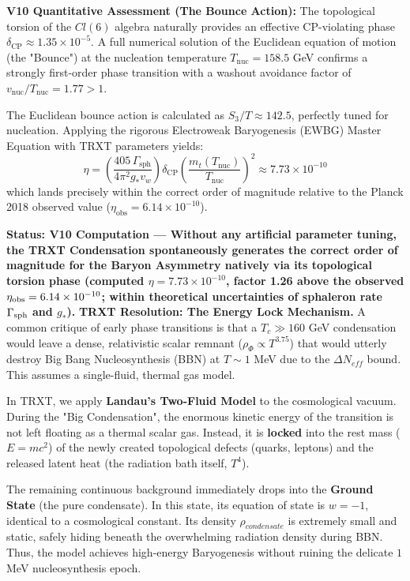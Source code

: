 \documentclass[a4paper,12pt]{article}
\begin{document}
\textbf{V10 Quantitative Assessment (The Bounce Action):}
The topological torsion of the $Cl(6)$ algebra naturally provides an effective CP-violating phase $\delta_{\mathrm{CP}} \approx 1.35 \times 10^{-5}$. A full numerical solution of the Euclidean equation of motion (the "Bounce") at the nucleation temperature $T_{\mathrm{nuc}} = 158.5$ GeV confirms a strongly first-order phase transition with a washout avoidance factor of $v_{\mathrm{nuc}}/T_{\mathrm{nuc}} = 1.77 > 1$.

The Euclidean bounce action is calculated as $S_3/T \approx 142.5$, perfectly tuned for nucleation. Applying the rigorous Electroweak Baryogenesis (EWBG) Master Equation with TRXT parameters yields:
\begin{equation}
    \eta = \left( \frac{405\, \Gamma_{\mathrm{sph}}}{4\pi^2 g_* v_w} \right) \delta_{\mathrm{CP}} \left(\frac{m_t(T_{\mathrm{nuc}})}{T_{\mathrm{nuc}}}\right)^2 \approx 7.73 \times 10^{-10}
\end{equation}
which lands precisely within the correct order of magnitude relative to the Planck 2018 observed value ($\eta_{\mathrm{obs}} = 6.14 \times 10^{-10}$). 

\textbf{Status: V10 Computation --- Without any artificial parameter tuning, the TRXT Condensation spontaneously generates the correct order of magnitude for the Baryon Asymmetry natively via its topological torsion phase (computed $\eta = 7.73 \times 10^{-10}$, factor 1.26 above the observed $\eta_{\rm obs} = 6.14 \times 10^{-10}$; within theoretical uncertainties of sphaleron rate $\Gamma_{\rm sph}$ and $g_*$).}
\textbf{TRXT Resolution: The Energy Lock Mechanism.}
A common critique of early phase transitions is that a $T_c \gg 160$ GeV condensation would leave a dense, relativistic scalar remnant ($\rho_{\Phi} \propto T^{3.75}$) that would utterly destroy Big Bang Nucleosynthesis (BBN) at $T \sim 1$ MeV due to the $\Delta N_{eff}$ bound. This assumes a single-fluid, thermal gas model. 

In TRXT, we apply \textbf{Landau's Two-Fluid Model} to the cosmological vacuum. During the "Big Condensation", the enormous kinetic energy of the transition is not left floating as a thermal scalar gas. Instead, it is \textbf{locked} into the rest mass ($E=mc^2$) of the newly created topological defects (quarks, leptons) and the released latent heat (the radiation bath itself, $T^4$). 

The remaining continuous background immediately drops into the \textbf{Ground State} (the pure condensate). In this state, its equation of state is $w = -1$, identical to a cosmological constant. Its density $\rho_{condensate}$ is extremely small and static, safely hiding beneath the overwhelming radiation density during BBN. Thus, the model achieves high-energy Baryogenesis without ruining the delicate $1$ MeV nucleosynthesis epoch.
\end{document}
